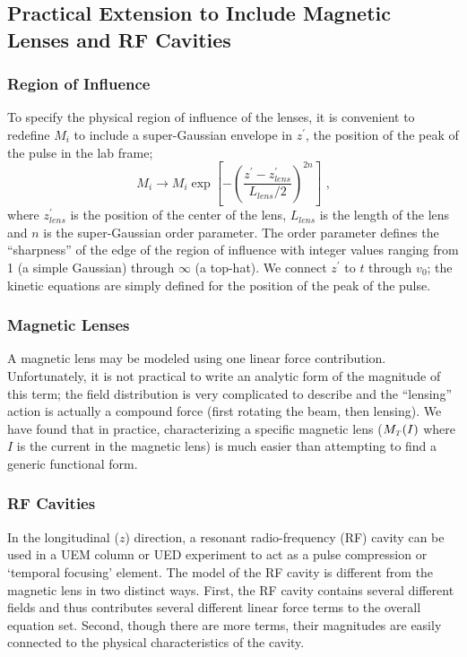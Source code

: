 \subsection{Practical Extension to Include Magnetic Lenses and RF Cavities}

\subsubsection{Region of Influence}

To specify the physical region of influence of the lenses, it is convenient to redefine $M_{i}$ to include a super-Gaussian envelope in $z^{\prime}$, the position of the peak of the pulse in the lab frame;
\begin{equation} \label{eq:reg_of_influence}
  M_{i}	\to M_{i} \exp \left [ - \left (  \frac{ z^{\prime} - z_{lens}^{\prime} }{ L_{lens} / 2 } \right )^{ 2 n } \right ] \text{ ,}
\end{equation}
where $z_{lens}^{\prime}$ is the position of the center of the lens, $L_{lens}$ is the length of the lens and $n$ is the super-Gaussian order parameter.
The order parameter defines the ``sharpness'' of the edge of the region of influence with integer values ranging from 1 (a simple Gaussian) through $\infty$ (a top-hat).
We connect $z^{\prime}$ to $t$ through $ v_{{ \scriptscriptstyle 0}} $; the kinetic equations are simply defined for the position of the peak of the pulse.

\subsubsection{Magnetic Lenses}

A magnetic lens may be modeled using one linear force contribution.
Unfortunately, it is not practical to write an analytic form of the magnitude of this term; the field distribution is very complicated to describe\cite{montgomery_some_1961} and the ``lensing'' action is actually a compound force (first rotating the beam, then lensing).
We have found that in practice, characterizing a specific magnetic lens ($M_{{\scriptscriptstyle T}}(I)$ where $I$ is the current in the magnetic lens) is much easier than attempting to find a generic functional form.

\subsubsection{RF Cavities}

In the longitudinal ($ z $) direction, a resonant radio-frequency (RF) cavity can be used in a UEM column or UED experiment \cite{oudheusden_electron_2007,fill_sub-fs_2006} to act as a pulse compression or `temporal focusing' element.
The model of the RF cavity is different from the magnetic lens in two distinct ways.
First, the RF cavity contains several different fields and thus contributes several different linear force terms to the overall equation set.
Second, though there are more terms, their magnitudes are easily connected to the physical characteristics of the cavity.

